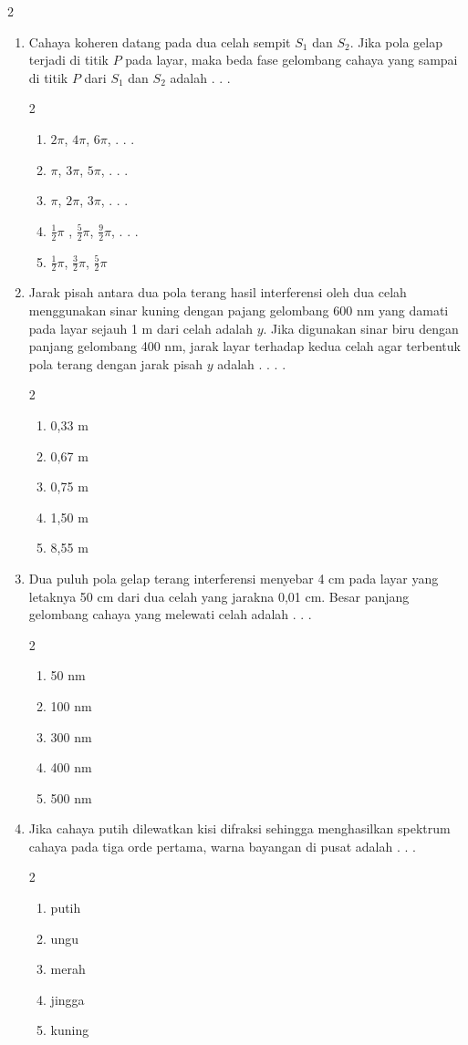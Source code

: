 \documentclass[10pt,a4paper]{extarticle}
\newcommand{\pilgani}[1]{                            \vspace{-0.3cm}\begin{multicols}{2}
 \begin{enumerate}[label=\Alph*., itemsep=0pt,topsep=0pt,leftmargin=*,align=Center]#1                     \end{enumerate}
 \phantom{ini cuma sapi, wedus, dan ayam}
 \end{multicols}}
\begin{document}
\begin{multicols*}{2}
\begin{enumerate}
\item Cahaya koheren datang pada dua celah sempit $S_1$ dan $S_2$. Jika pola gelap terjadi di titik $P$ pada layar, maka beda fase gelombang cahaya yang sampai di titik $P$ dari $S_1$ dan $S_2$ adalah . . .
\pilgani{
        \item $2\pi$, $4\pi$, $6\pi$, . . .
        \item $\pi$, $3\pi$, $5\pi$, . . .
        \item $\pi$, $2\pi$, $3\pi$, . . .
        \item $\frac{1}{2}\pi$ , $\frac{5}{2}\pi$, $\frac{9}{2}\pi$, . . .
        \item $\frac{1}{2} \pi$, $\frac{3}{2}\pi$, $\frac{5}{2} \pi$
        }

 \vspace{2cm}

 \item Jarak pisah antara dua pola terang hasil interferensi oleh dua celah menggunakan sinar kuning dengan pajang gelombang 600 nm yang damati pada layar sejauh 1 m dari celah adalah $y$. Jika digunakan sinar biru dengan panjang gelombang 400 nm, jarak layar terhadap kedua celah agar terbentuk pola terang dengan jarak pisah $y$ adalah . . . .

 \pilgani{
        \item 0,33 m
        \item 0,67 m
        \item 0,75 m
        \item 1,50 m
        \item 8,55 m
        }
\vspace{2cm}

\item Dua puluh pola gelap terang interferensi menyebar 4 cm pada layar yang letaknya 50 cm dari dua celah yang jarakna 0,01 cm. Besar panjang gelombang cahaya yang melewati celah adalah . . .
\pilgani{
        \item 50 nm
        \item 100 nm
        \item 300 nm
        \item 400 nm
        \item 500 nm
        }
\vspace{2cm}



\item Jika cahaya putih dilewatkan kisi difraksi sehingga menghasilkan spektrum cahaya pada tiga orde pertama, warna bayangan di pusat adalah . . .
\pilgani{
        \item putih
        \item ungu
        \item merah
        \item jingga
        \item kuning
        }
\vspace{2cm}


\end{enumerate}
\end{multicols*}
\end{document}
